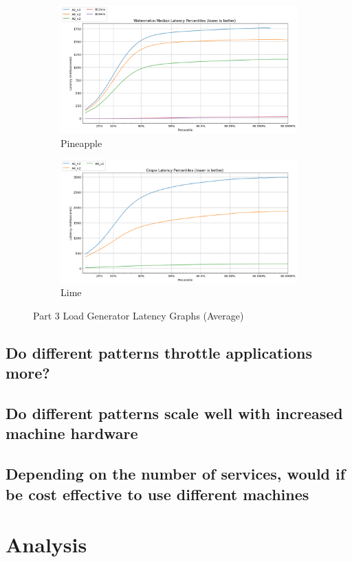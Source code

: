 \begin{figure}[H]
     \centering
     \begin{subfigure}[b]{0.49\textwidth}
         \centering
         \includegraphics[width=\textwidth]{images/watermelon_latency.png}
         \caption{Pineapple} 
         \label{fig:watermelon_compose}
     \end{subfigure}
     \hfill
     \begin{subfigure}[b]{0.49\textwidth}
         \centering
         \includegraphics[width=\textwidth]{images/grape_latency.png}
         \caption{Lime}
         \label{fig:grape_compose}
     \end{subfigure}
    
        \caption{Part 3 Load Generator Latency Graphs (Average)}
        \label{fig:part_3_compose}
\end{figure}

\section{Do different patterns throttle applications more?}
\section{Do different patterns scale well with increased machine hardware}
\section{Depending on the number of services, would if be cost effective to use different machines}

\chapter{Analysis}